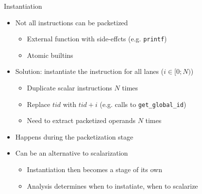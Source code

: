 \begin{frame}{Instantiation}

\begin{itemize}
    \item Not all instructions can be packetized
    \begin{itemize}
        \item External function with side-effcts (e.g. \texttt{printf})
        \item Atomic builtins
    \end{itemize}
    \item Solution: instantiate the instruction for all lanes ($i \in [0;N)$)
    \begin{itemize}
        \item Duplicate scalar instructions $N$ times
        \item Replace $tid$ with \texttt{$tid + i$} (e.g. calls to \texttt{get\_global\_id})
        \item Need to extract packetized operands $N$ times %
    \end{itemize}
    \item Happens during the packetization stage
    \item Can be an alternative to scalarization
    \begin{itemize}
        \item Instantiation then becomes a stage of its own
        \item Analysis determines when to instatiate, when to scalarize
    \end{itemize}
\end{itemize}

\end{frame}


